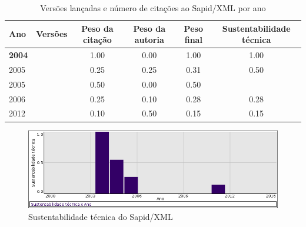 \begin{table}[H]
\caption{Versões lançadas e número de citações ao Sapid/XML por ano}
\centering
\begin{tabular}{| l | c | c | c | c | c |}
  \hline
  Ano & Versões & Peso da citação & Peso da autoria & Peso final & Sustentabilidade técnica \\
  \hline
            {\bf 2004}
          &
          
          &
          1.00
          &
          0.00
          &
          1.00
          &
            {\color{blue} 1.00}
          \\
\hline
            2005
          &
          
          &
          0.25
          &
          0.25
          &
          0.31
          &
            {\color{blue} 0.50}
          \\
            2005
          &
          
          &
          0.50
          &
          0.00
          &
          0.50
          &
          \\
\hline
            2006
          &
          
          &
          0.25
          &
          0.10
          &
          0.28
          &
            {\color{red} 0.28}
          \\
\hline
            2012
          &
          
          &
          0.10
          &
          0.50
          &
          0.15
          &
            {\color{red} 0.15}
          \\
\hline
\end{tabular}
\end{table}

\begin{figure}[h]
  \center
  \includegraphics[scale=0.50]{imagens/softwares-charts/sapid-xml.png}
  \caption{Sustentabilidade técnica do Sapid/XML}
\end{figure}



